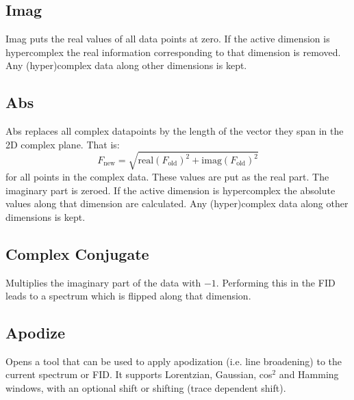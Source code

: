 \documentclass[11pt,a4paper]{article}
\begin{document}
\subsection{Imag}
Imag puts the real values of all data points at zero. If the active dimension is hypercomplex the real information corresponding to that dimension is removed. Any (hyper)complex data along other dimensions is kept.

\subsection{Abs}
Abs replaces all complex datapoints by the length of the vector they span in the 2D complex plane. That is:
\begin{equation*}
F_\text{new} = \sqrt{\text{real}(F_\text{old})^2 + \text{imag}(F_\text{old})^2}
\end{equation*}
for all points in the complex data. These values are put as the real part. The imaginary part is zeroed. If the active dimension is hypercomplex the absolute values along that dimension are calculated. Any (hyper)complex data along other dimensions is kept.


\subsection{Complex Conjugate}
Multiplies the imaginary part of the data with $-1$. Performing this in the FID leads to a spectrum which is flipped along that dimension.




\subsection{Apodize}
Opens a tool that can be used to apply apodization (i.e. line broadening) to the current spectrum or FID. It supports Lorentzian, Gaussian, cos$^2$ and Hamming windows, with an optional shift or shifting (trace dependent shift).

\end{document}
